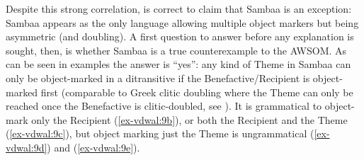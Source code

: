 \documentclass[output=paper
,modfonts
,nonflat]{langsci/langscibook}
\begin{document}
Despite this strong correlation, \citet{Riedel2009} is correct to claim that Sambaa is an exception: Sambaa appears as the only language allowing multiple object markers but being asymmetric (and doubling). A first question to answer before any explanation is sought, then, is whether Sambaa is a true counterexample to the AWSOM. As can be seen in examples  the answer is ``yes'': any kind of Theme in Sambaa can only be object-marked in a ditransitive if the Benefactive/Recipient is object-marked first (comparable to Greek clitic doubling where the Theme can only be reached once the Benefactive is clitic-doubled, see \citealt{Anagnostopoulou2003, Anagnostopoulou2014}).
It is grammatical to object-mark only the Recipient (\ref{ex-vdwal:9b}), or both the Recipient and the Theme (\ref{ex-vdwal:9c}), but object marking just the Theme is ungrammatical (\ref{ex-vdwal:9d}) and (\ref{ex-vdwal:9e}).
\end{document}

